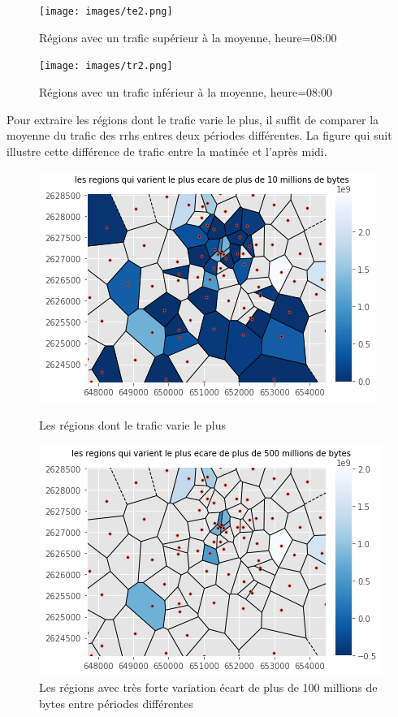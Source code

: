 \documentclass{report}
\begin{document}
\begin{figure}[H]
   \begin{minipage}{0.4\textwidth}
     \centering
     \texttt{[image: images/te2.png]}
     \caption{Régions avec un trafic supérieur à la moyenne, heure=08:00}\label{Fig:Data1}
   \end{minipage}\hfill
   \begin{minipage}{0.4\textwidth}
     \centering
     \texttt{[image: images/tr2.png]}
     \caption{Régions avec un trafic inférieur à la moyenne, heure=08:00}\label{Fig:Data2}
   \end{minipage}   
\end{figure} 

Pour extraire les régions dont le trafic varie le plus, il suffit de comparer la moyenne du trafic des rrhs entres deux périodes différentes. La figure qui suit illustre cette différence de trafic entre la matinée et l'après midi.
\begin{figure}[H]
   \begin{minipage}{0.4\textwidth}
     \centering
     \includegraphics[scale=0.55]{images/var2.png}
     \caption{Les régions dont le trafic varie le plus}\label{Fig:Data1}
   \end{minipage}\hfill
   \begin{minipage}{0.4\textwidth}
     \centering
     \includegraphics[scale=0.55]{images/var1.png}
     \caption{Les régions avec très forte variation écart de plus de 100 millions de bytes entre périodes différentes }\label{Fig:Data2}
   \end{minipage}
\end{figure} 
\end{document}
